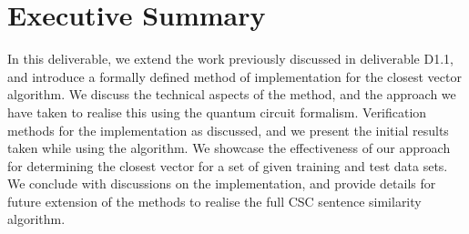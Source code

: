 \documentclass[11pt]{article}
\begin{document}
\section*{Executive Summary}


In this deliverable, we extend the work previously discussed in deliverable D1.1, and introduce a formally defined method of implementation for the closest vector algorithm. We discuss the technical aspects of the method, and the approach we have taken to realise this using the quantum circuit formalism. Verification methods for the implementation as discussed, and we present the initial results taken while using the algorithm. We showcase the effectiveness of our approach for determining the closest vector for a set of given training and test data sets. We conclude with discussions on the implementation, and provide details for future extension of the methods to realise the full CSC sentence similarity algorithm.




\newpage
\tableofcontents
\newpage
\listoffigures
\listoftables

\newpage


\newpage

\end{document}
